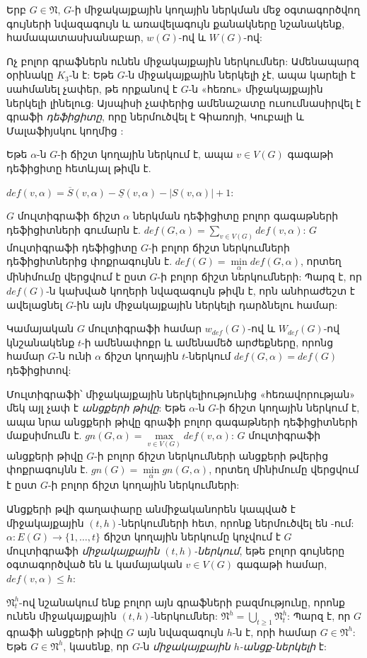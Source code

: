Երբ $G \in \mathfrak{N}$, $G$-ի միջակայքային կողային ներկման մեջ օգտագործվող գույների նվազագույն և առավելագույն քանակները նշանակենք, համապատասխանաբար, $w(G)$-ով և $W(G)$-ով:

Ոչ բոլոր գրաֆներն ունեն միջակայքային ներկումներ: Ամենապարզ օրինակը $K_3$-ն է: Եթե $G$-ն միջակայքային ներկելի չէ, ապա կարելի է սահմանել չափեր, թե որքանով է $G$-ն «հեռու» միջակայքային ներկելի լինելուց: Այսպիսի չափերից ամենաշատը ուսումնասիրվել է գրաֆի \textit{դեֆիցիտը}, որը ներմուծվել է Գիառոյի, Կուբալի և Մալաֆիյսկու կողմից \cite{GiaroKubaleMalafiejski1999}:

Եթե $\alpha$-ն $G$-ի ճիշտ կողային ներկում է, ապա $v\in V(G)$ գագաթի դեֆիցիտը հետևյալ թիվն է. 
\begin{center}
$def(v, \alpha)=\overline{S}(v,\alpha) - \underline{S}(v,\alpha) - |S(v,\alpha)| + 1$:
\end{center}
$G$ մուլտիգրաֆի ճիշտ $\alpha$ ներկման դեֆիցիտը բոլոր գագաթների դեֆիցիտների գումարն է. 
$def(G, \alpha) = \sum\limits_{v \in V(G)}{def(v,\alpha)}$: 
$G$ մուլտիգրաֆի դեֆիցիտը $G$-ի բոլոր ճիշտ ներկումների դեֆիցիտներից փոքրագույնն է.
$def(G) = \min\limits_{\alpha}{def(G,\alpha)}$, որտեղ մինիմումը վերցվում է ըստ $G$-ի բոլոր ճիշտ ներկումների: Պարզ է, որ $def(G)$-ն կախված կողերի նվազագույն թիվն է, որն անհրաժեշտ է ավելացնել $G$-ին այն միջակայքային ներկելի դարձնելու համար: 

Կամայական $G$ մուլտիգրաֆի համար $w_{def}(G)$-ով և $W_{def}(G)$-ով կնշանակենք $t$-ի ամենափոքր և ամենամեծ արժեքները, որոնց համար $G$-ն ունի $\alpha$ ճիշտ կողային $t$-ներկում $def(G,\alpha)=def(G)$ դեֆիցիտով:

Մուլտիգրաֆի՝ միջակայքային ներկելիությունից «հեռավորության» մեկ այլ չափ է \textit{անցքերի թիվը}: Եթե $\alpha$-ն $G$-ի ճիշտ կողային ներկում է, ապա նրա անցքերի թիվը գրաֆի բոլոր գագաթների դեֆիցիտների մաքսիմումն է. $gn(G, \alpha) = \max\limits_{v \in V(G)}{def(v,\alpha)}$: $G$ մուլտիգրաֆի անցքերի թիվը $G$-ի բոլոր ճիշտ ներկումների անցքերի թվերից փոքրագույնն է. $gn(G) = \min\limits_{\alpha}{gn(G,\alpha)}$, որտեղ մինիմումը վերցվում է ըստ $G$-ի բոլոր ճիշտ կողային ներկումների:

Անցքերի թվի գաղափարը անմիջականորեն կապված է միջակայքային $(t,h)$-ներկումների հետ, որոնք ներմուծվել են \cite{PetrosyanArakelyan2007}-ում: $\alpha : E(G) \rightarrow \{1,\ldots,t\}$ ճիշտ կողային ներկումը կոչվում է $G$ մուլտիգրաֆի \textit{միջակայքային $(t,h)$-ներկում}, եթե բոլոր գույները օգտագործված են և կամայական $v \in V(G)$ գագաթի համար, $def(v, \alpha) \leq h$:

$\mathfrak{N}_t^h$-ով նշանակում ենք բոլոր այն գրաֆների բազմությունը, որոնք ունեն միջակայքային $(t,h)$-ներկումներ: $\mathfrak{N}^h = \bigcup_{t \geq 1}{\mathfrak{N}_t^h}$: Պարզ է, որ $G$ գրաֆի անցքերի թիվը $G$ այն նվազագույն $h$-ն է, որի համար  $G \in \mathfrak{N}^h$: Եթե $G \in \mathfrak{N}^h$, կասենք, որ $G$-ն \textit{միջակայքային $h$-անցք-ներկելի} է: 

